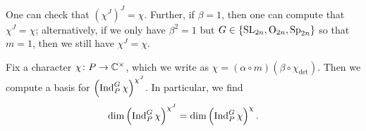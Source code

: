 \begin{remark}
    One can check that $\left(\chi^J\right)^J=\chi$. Further, if $\beta=1$, then one can compute that $\chi^J=\chi$; alternatively, if we only have $\beta^2=1$ but $G\in\{\mathrm{SL}_{2n},\mathrm{O}_{2n},\mathrm{Sp}_{2n}\}$ so that $m=1$, then we still have $\chi^J=\chi$.
	
\end{remark}
\begin{proposition} \label{prop:twisted-ind-basis}
	Fix a character $\chi\colon P\to\mathbb C^\times$, which we write as $\chi=(\alpha\circ m)(\beta\circ\chi_{\det})$. Then we compute a basis for $\left(\operatorname{Ind}_P^G\chi\right)^{\chi^J}$.%
    In particular, we find
	\[\dim\left(\operatorname{Ind}_P^G\chi\right)^{\chi^J}=\dim\left(\operatorname{Ind}_P^G\chi\right)^{\chi}.\]
\end{proposition}
